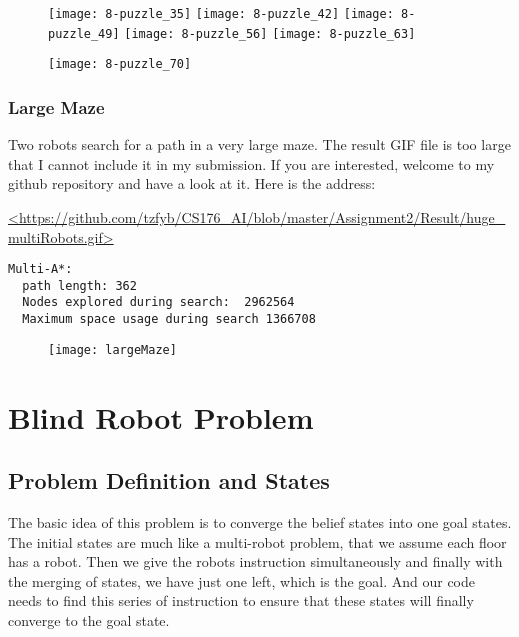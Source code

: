 \documentclass{article}
\begin{document}
\begin{figure}[!htb]

  \texttt{[image: 8-puzzle\_35]}
\endminipage\hfill
{}
  \texttt{[image: 8-puzzle\_42]}
\endminipage\hfill
{}
  \texttt{[image: 8-puzzle\_49]}
\endminipage
{}
  \texttt{[image: 8-puzzle\_56]}
\endminipage
{}
  \texttt{[image: 8-puzzle\_63]}
\endminipage
\end{figure}

\begin{figure}[!htb]

  \texttt{[image: 8-puzzle\_70]}
\endminipage\hfill
\end{figure}

\clearpage
\subsubsection{Large Maze}
Two robots search for a path in a very large maze. The result GIF file is too large that I cannot include it in my submission. If you are interested, welcome to my github repository and have a look at it. Here is the address:

\url{<https://github.com/tzfyb/CS176_AI/blob/master/Assignment2/Result/huge_multiRobots.gif>}

\begin{lstlisting}
Multi-A*:  
  path length: 362
  Nodes explored during search:  2962564
  Maximum space usage during search 1366708
\end{lstlisting}
\begin{figure}[!htb]

  \texttt{[image: largeMaze]}
\endminipage\hfill
\end{figure}

\clearpage
\section{Blind Robot Problem}
\subsection{Problem Definition and States}
The basic idea of this problem is to converge the belief states into one goal states. The initial states are much like a multi-robot problem, that we assume each floor has a robot. Then we give the robots instruction simultaneously and finally with the merging of states, we have just one left, which is the goal. And our code needs to find this series of instruction to ensure that these states will finally converge to the goal state.
\end{document}
